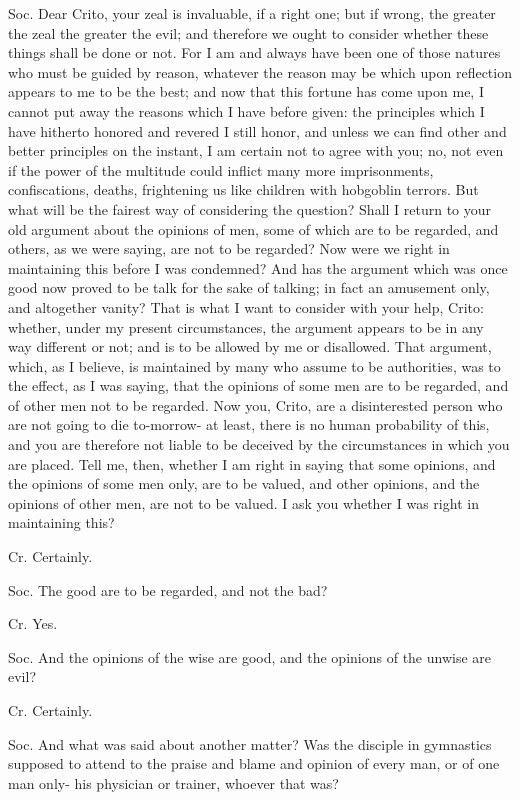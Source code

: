 Soc. Dear Crito, your zeal is invaluable, if a right one; but if wrong,
the greater the zeal the greater the evil; and therefore we ought
to consider whether these things shall be done or not. For I am and
always have been one of those natures who must be guided by reason,
whatever the reason may be which upon reflection appears to me to
be the best; and now that this fortune has come upon me, I cannot
put away the reasons which I have before given: the principles which
I have hitherto honored and revered I still honor, and unless we can
find other and better principles on the instant, I am certain not
to agree with you; no, not even if the power of the multitude could
inflict many more imprisonments, confiscations, deaths, frightening
us like children with hobgoblin terrors. But what will be the fairest
way of considering the question? Shall I return to your old argument
about the opinions of men, some of which are to be regarded, and others,
as we were saying, are not to be regarded? Now were we right in maintaining
this before I was condemned? And has the argument which was once good
now proved to be talk for the sake of talking; in fact an amusement
only, and altogether vanity? That is what I want to consider with
your help, Crito: whether, under my present circumstances, the argument
appears to be in any way different or not; and is to be allowed by
me or disallowed. That argument, which, as I believe, is maintained
by many who assume to be authorities, was to the effect, as I was
saying, that the opinions of some men are to be regarded, and of other
men not to be regarded. Now you, Crito, are a disinterested person
who are not going to die to-morrow- at least, there is no human probability
of this, and you are therefore not liable to be deceived by the circumstances
in which you are placed. Tell me, then, whether I am right in saying
that some opinions, and the opinions of some men only, are to be valued,
and other opinions, and the opinions of other men, are not to be valued.
I ask you whether I was right in maintaining this? 

Cr. Certainly. 

Soc. The good are to be regarded, and not the bad? 

Cr. Yes. 

Soc. And the opinions of the wise are good, and the opinions of the
unwise are evil? 

Cr. Certainly. 

Soc. And what was said about another matter? Was the disciple in gymnastics
supposed to attend to the praise and blame and opinion of every man,
or of one man only- his physician or trainer, whoever that was?

